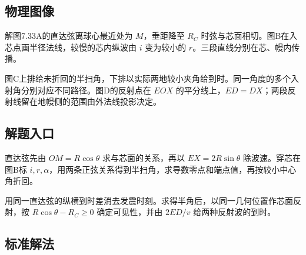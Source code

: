 \documentclass[UTF8,fontset=fandol,a4paper,11pt]{ctexart}
\begin{document}


\subsection*{物理图像}

解图7.33A的直达弦离球心最近处为 $M$，垂距降至 $R_C$ 时弦与芯面相切。图B在入芯点画半径法线，较慢的芯内纵波由 $i$ 变为较小的 $r$。三段直线分别在芯、幔内传播。

图C上排给未折回的半扫角，下排以实际两地较小夹角给到时。同一角度的多个入射角分别对应不同路径。图D的反射点在 $EOX$ 的平分线上，$ED=DX$；两段反射线留在地幔侧的范围由外法线投影决定。




\subsection*{解题入口}

直达弦先由 $OM=R\cos\theta$ 求与芯面的关系，再以 $EX=2R\sin\theta$ 除波速。穿芯在图B标 $i,r,\alpha$，用两条正弦关系得到半扫角，求导数零点和端点值，再按较小中心角折回。

用同一直达弦的纵横到时差消去发震时刻。求得半角后，以同一几何位置作芯面反射，按 $R\cos\theta-R_C\ge0$ 确定可见性，并由 $2ED/v$ 给两种反射波的到时。



\subsection*{标准解法}
\end{document}
